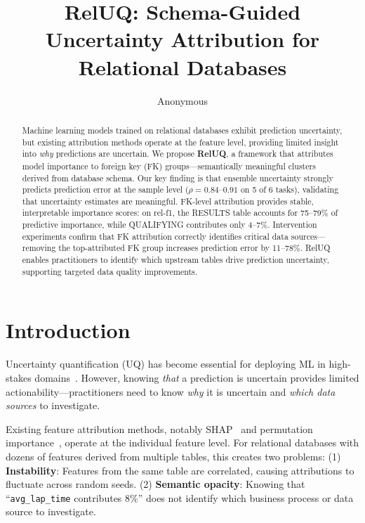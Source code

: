 \documentclass{article}
\title{RelUQ: Schema-Guided Uncertainty Attribution for Relational Databases}
\author{Anonymous}
\begin{document}
\maketitle

\begin{abstract}
Machine learning models trained on relational databases exhibit prediction uncertainty,
but existing attribution methods operate at the feature level, providing limited insight
into \emph{why} predictions are uncertain. We propose \textbf{RelUQ}, a framework that
attributes model importance to foreign key (FK) groups---semantically meaningful clusters
derived from database schema. Our key finding is that ensemble uncertainty strongly
predicts prediction error at the sample level ($\rho = 0.84$--$0.91$ on 5 of 6 tasks),
validating that uncertainty estimates are meaningful. FK-level attribution provides
stable, interpretable importance scores: on rel-f1, the RESULTS table accounts for
75--79\% of predictive importance, while QUALIFYING contributes only 4--7\%.
Intervention experiments confirm that FK attribution correctly identifies critical
data sources---removing the top-attributed FK group increases prediction error by
11--78\%. RelUQ enables practitioners to identify which upstream tables drive
prediction uncertainty, supporting targeted data quality improvements.
\end{abstract}

\section{Introduction}
\label{sec:intro}

Uncertainty quantification (UQ) has become essential for deploying ML in high-stakes
domains~\citep{gal2016dropout,lakshminarayanan2017simple}. However, knowing \emph{that}
a prediction is uncertain provides limited actionability---practitioners need to know
\emph{why} it is uncertain and \emph{which data sources} to investigate.

Existing feature attribution methods, notably SHAP~\citep{lundberg2017unified} and
permutation importance~\citep{breiman2001random}, operate at the individual feature
level. For relational databases with dozens of features derived from multiple tables,
this creates two problems:
(1) \textbf{Instability}: Features from the same table are correlated, causing
attributions to fluctuate across random seeds.
(2) \textbf{Semantic opacity}: Knowing that ``\texttt{avg\_lap\_time} contributes 8\%''
does not identify which business process or data source to investigate.
\end{document}

